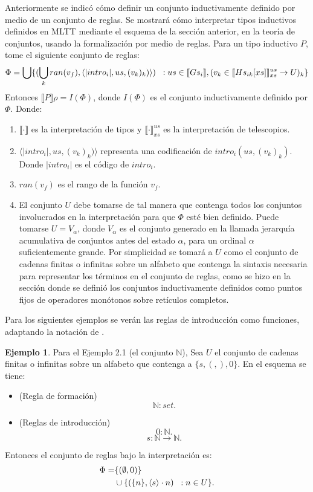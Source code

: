 \documentclass[11pt,oneside]{report}
\theoremstyle{plain}
\theoremstyle{definition}
\newtheorem{ejemplo}{Ejemplo}[chapter]
\newcommand{\N}{\mathbb{N}}
\begin{document}
Anteriormente se indicó cómo definir un conjunto inductivamente definido por medio de un conjunto de reglas. Se mostrará cómo interpretar tipos inductivos definidos en MLTT mediante el esquema de la sección anterior, en la teoría de conjuntos, usando la formalización por medio de reglas. Para un tipo inductivo $P$, tome el siguiente conjunto de reglas:
$$\Phi = \bigcup \{(\bigcup_{k} ran(v_{f}), \langle |intro_{i}|, us, (v_{k})_{k})\rangle)\hspace{2mm}: us\in\llbracket Gs_{i}\rrbracket, (v_k\in \llbracket Hs_{ik}[xs]\rrbracket_{xs}^{us}\to U)_{k} \}$$
Entonces $\llbracket P \rrbracket \rho = I(\Phi)$, donde $I(\Phi)$ es el conjunto inductivamente definido por $\Phi$. Donde:
\begin{enumerate}
    \item $\llbracket\cdot\rrbracket$ es la interpretación de tipos y $\llbracket\cdot\rrbracket_{xs}^{us}$ es la interpretación de telescopios.
    \item $ \langle |intro_{i}|, us, (v_{k})_{k})\rangle$ representa una codificación de $intro_{i}(us,(v_{k})_{k})$. Donde $|intro_{i}|$ es el código de $intro_{i}$.
    \item $ran(v_{f})$ es el rango de la función $v_{f}$.
    \item El conjunto $U$ debe tomarse de tal manera que contenga todos los conjuntos involucrados en la interpretación para que $\Phi$ esté bien definido. Puede tomarse $U = V_{\alpha}$, donde $V_\alpha$ es el conjunto generado en la llamada jerarquía acumulativa de conjuntos antes del estado $\alpha$, para un ordinal $\alpha$ suficientemente grande. Por simplicidad se tomará a $U$ como el conjunto de cadenas finitas o infinitas sobre un alfabeto que contenga la sintaxis necesaria para representar los términos en el conjunto de reglas, como se hizo en la sección donde se definió los conjuntos inductivamente definidos como puntos fijos de operadores monótonos sobre retículos completos.
\end{enumerate}

Para los siguientes ejemplos se verán las reglas de introducción como funciones, adaptando la notación de \cite{Dybjer and Chalmer}.

\begin{ejemplo}
    Para el Ejemplo 2.1 (el conjunto $\N$), Sea $U$ el conjunto de cadenas finitas o infinitas sobre un alfabeto que contenga a $\{s, (,), 0\}$. En el esquema se tiene:
    \begin{itemize}
        \item (Regla de formación)
              $$\N : set.$$
        \item (Reglas de introducción)
              $$0:\N.$$
              $$s:\N\to\N.$$
    \end{itemize}

    Entonces el conjunto de reglas bajo la interpretación es:
    \begin{align*}
        \Phi = & \{(\emptyset, 0)\}\\
               & \cup \{(\{n\}, \langle s\rangle\cdot n)\hspace{2mm}: n \in U\}
    .\end{align*}
\end{ejemplo}
\end{document}
